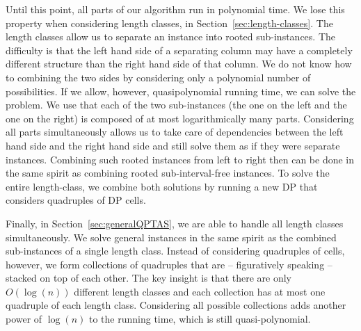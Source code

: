 Until this point, all parts of our algorithm run in polynomial time.
We lose this property when considering length classes, in Section~\ref{sec:length-classes}.
The length classes allow us to separate an instance into rooted sub-instances.
The difficulty is that the left hand side of a separating column may have a completely different structure than the right hand side of that column.
We do not know how to combining the two sides by considering only a polynomial number of possibilities.
If we allow, however, quasipolynomial running time, we can solve the problem. 
We use that each of the two sub-instances (the one on the left and the one on the right) is composed of at most logarithmically many parts.
Considering all parts simultaneously allows us to take care of dependencies between the left hand side and the right hand side and still solve them as if they were separate instances.
%
Combining such rooted instances from left to right then can be done in the same spirit as combining rooted sub-interval-free instances.
To solve the entire length-class, we combine both solutions by running a new DP that considers quadruples of DP cells.

Finally, in Section~\ref{sec:generalQPTAS}, we are able to handle all length classes simultaneously. 
We solve general instances in the same spirit as the combined sub-instances of a single length class.
Instead of considering quadruples of cells, however, we form collections of quadruples that are -- figuratively speaking -- stacked on top of each other.
The key insight is that there are only $O(\log(n))$ different length classes and each collection has at most one quadruple of each length class.
Considering all possible collections adds another power of $\log(n)$ to the running time, which is still quasi-polynomial.

